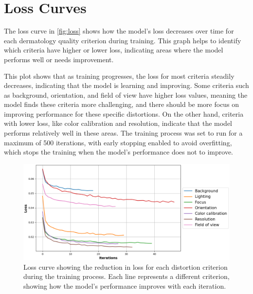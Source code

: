 \section{Loss Curves}
\label{sec:LossCurveAnalysis}
The loss curve in \autoref{fig:loss} shows how the model’s loss decreases over time for each dermatology quality criterion during training. This graph helps to identify which criteria have higher or lower loss, indicating areas where the model performs well or needs improvement. \par
\vspace{\baselineskip}
\noindent
This plot shows that as training progresses, the loss for most criteria steadily decreases, indicating that the model is learning and improving. Some criteria such as background, orientation, and field of view have higher loss values, meaning the model finds these criteria more challenging, and there should be more focus on improving performance for these specific distortions. On the other hand, criteria with lower loss, like color calibration and resolution, indicate that the model performs relatively well in these areas. The training process was set to run for a maximum of 500 iterations, with early stopping enabled to avoid overfitting, which stops the training when the model’s performance does not to improve.\par
\clearpage
\begin{figure}[ht]
    \centering
    \includegraphics[keepaspectratio,width=13cm]{img/loss.png}
    \caption{ Loss curve showing the reduction in loss for each distortion criterion during the training process. Each line represents a different criterion, showing how the model’s performance improves with each iteration.}
    \label{fig:loss}
\end{figure}


